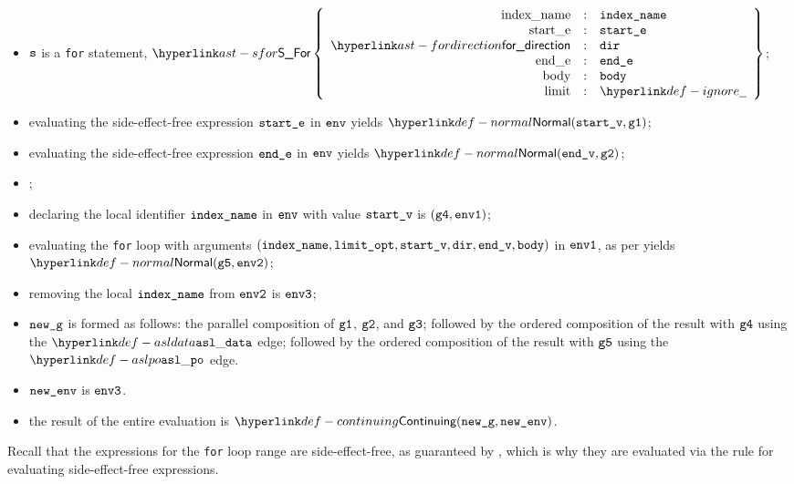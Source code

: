 \ProseParagraph
\AllApply
\begin{itemize}
  \item $\texttt{s}$ is a \texttt{for} statement, $\SFor\left\{\begin{array}{rcl}
    \Forindexname &:& \vindexname\\
    \Forstarte &:& \vstarte\\
    \fordirection &:& \vdir\\
    \Forende &:& \vende\\
    \Forbody &:& \vbody\\
    \Forlimit &:& \Ignore
  \end{array}\right\}$;
  \item evaluating the side-effect-free expression $\texttt{start\_e}$ in $\env$ yields
        $\Normal(\vstartv, \vgone)$\ProseOrError;
  \item evaluating the side-effect-free expression $\texttt{end\_e}$ in $\env$ yields
        $\Normal(\vendv, \vgtwo)$\ProseOrError;
  \item \Proseevallimit{$\env$}{$\velimitopt$}{$\Normal(\vlimitopt, \vgthree)$}\ProseOrError;
  \item declaring the local identifier $\texttt{index\_name}$ in $\env$ with value $\texttt{start\_v}$ is $(\texttt{g4}, \texttt{env1})$;
  \item evaluating the \texttt{for} loop with arguments $(\texttt{index\_name}, \texttt{limit\_opt}, \texttt{start\_v}, \texttt{dir}, \texttt{end\_v}, \texttt{body})$ in $\texttt{env1}$,
        as per  yields $\Normal(\vgfive, \envtwo)$\ProseOrAbnormal;
  \item removing the local $\texttt{index\_name}$ from $\texttt{env2}$ is $\texttt{env3}$;
  \item $\texttt{new\_g}$ is formed as follows:
        the parallel composition of $\texttt{g1}$, $\texttt{g2}$, and $\texttt{g3}$;
        followed by the ordered composition of the result with $\texttt{g4}$ using the $\asldata$ edge;
        followed by the ordered composition of the result with $\texttt{g5}$ using the $\aslpo$ edge.
  \item $\texttt{new\_env}$ is $\texttt{env3}$.
  \item the result of the entire evaluation is $\Continuing(\newg, \newenv)$.
\end{itemize}
\FormallyParagraph
Recall that the expressions for the \texttt{for} loop range are
side-effect-free, as guaranteed by , which is why
they are evaluated via the rule for evaluating side-effect-free expressions.
